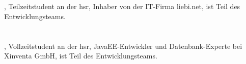 \section{\rlif}
\xxx[remo]
\begin{minipage}[t]{0.25\textwidth}
	\vspace{0pt}
\end{minipage}
\begin{minipage}[t]{0.8\textwidth}
	\vspace{0pt} 
	\rlif, Teilzeitstudent an der \gls{hsr}, Inhaber von der IT-Firma liebi.net, ist Teil des Entwicklungsteams.
\end{minipage}

\section{\chuf}
\xxx[christoph]
\begin{minipage}[t]{0.25\textwidth}
	\vspace{0pt}
\end{minipage}
\begin{minipage}[t]{0.8\textwidth}
	\vspace{0pt}
	\chuf, Vollzeitstudent an der \gls{hsr}, JavaEE-Entwickler und Datenbank-Experte bei Xinventa GmbH, ist Teil des Entwicklungsteams.
\end{minipage}


